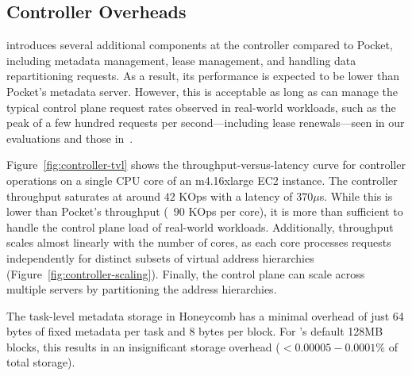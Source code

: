 \subsection{Controller Overheads}
\label{ssec:controller-scale}

\jiffy introduces several additional components at the controller compared to Pocket, including metadata management, lease management, and handling data repartitioning requests. As a result, its performance is expected to be lower than Pocket's metadata server. However, this is acceptable as long as \jiffy can manage the typical control plane request rates observed in real-world workloads, such as the peak of a few hundred requests per second—including lease renewals—seen in our evaluations and those in~\cite{pocket}.

Figure~\ref{fig:controller-tvl} shows the throughput-versus-latency curve for \jiffy controller operations on a single CPU core of an m4.16xlarge EC2 instance. The controller throughput saturates at around $42$ KOps with a latency of $370\mu$s. While this is lower than Pocket's throughput (~$90$ KOps per core), it is more than sufficient to handle the control plane load of real-world workloads. Additionally, throughput scales almost linearly with the number of cores, as each core processes requests independently for distinct subsets of virtual address hierarchies (Figure~\ref{fig:controller-scaling}). Finally, the control plane can scale across multiple servers by partitioning the address hierarchies.

 The task-level metadata storage in Honeycomb has a minimal overhead of just 64 bytes of fixed metadata per task and 8 bytes per block. For \jiffy's default 128MB blocks, this results in an insignificant storage overhead ($<0.00005-0.0001\%$ of total storage).



